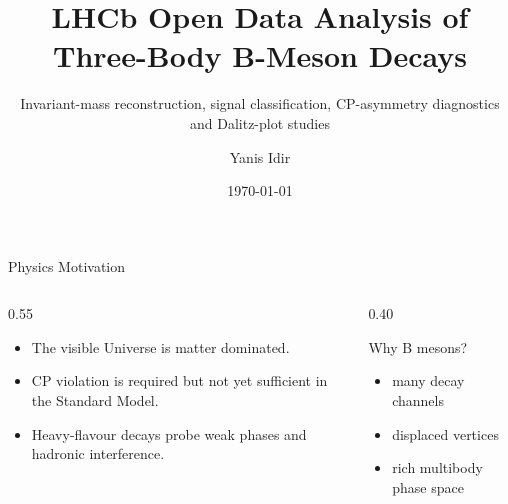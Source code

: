 \documentclass[aspectratio=169,10pt]{beamer}
\title[LHCb Open Data B Decays]{LHCb Open Data Analysis of Three-Body B-Meson Decays}
\subtitle{Invariant-mass reconstruction, signal classification, CP-asymmetry diagnostics and Dalitz-plot studies}
\author{Yanis Idir}
\institute{HEP portfolio project}
\date{\today}
\begin{document}
\begin{frame}
  \titlepage
\end{frame}

\begin{frame}{Physics Motivation}
  \begin{columns}[T,onlytextwidth]
    \begin{column}{0.55\textwidth}
      \begin{itemize}
        \item The visible Universe is matter dominated.
        \item CP violation is required but not yet sufficient in the Standard Model.
        \item Heavy-flavour decays probe weak phases and hadronic interference.
      \end{itemize}
    \end{column}
    \begin{column}{0.40\textwidth}
      \begin{block}{Why B mesons?}
        \begin{itemize}
          \item many decay channels
          \item displaced vertices
          \item rich multibody phase space
        \end{itemize}
      \end{block}
    \end{column}
  \end{columns}
\end{frame}
\end{document}
